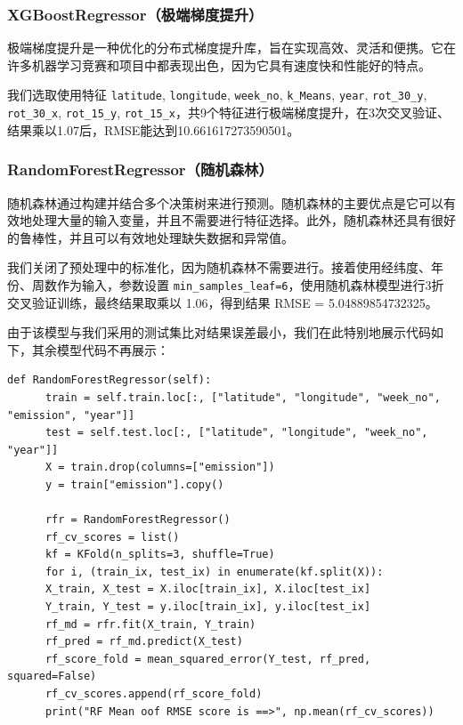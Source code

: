 \documentclass{ctexart}
\begin{document}
\begin{sloppypar}
\subsubsection{XGBoostRegressor（极端梯度提升）}

极端梯度提升是一种优化的分布式梯度提升库，旨在实现高效、灵活和便携。它在许多机器学习竞赛和项目中都表现出色，因为它具有速度快和性能好的特点。

我们选取使用特征 \texttt{latitude}, \texttt{longitude}, \texttt{week\_no}, \texttt{k\_Means}, \texttt{year}, \texttt{rot\_30\_y}, \texttt{rot\_30\_x}, \texttt{rot\_15\_y}, \texttt{rot\_15\_x}，共9个特征进行极端梯度提升，在3次交叉验证、结果乘以1.07后，RMSE能达到10.661617273590501。

\subsubsection{RandomForestRegressor（随机森林）}

随机森林通过构建并结合多个决策树来进行预测。随机森林的主要优点是它可以有效地处理大量的输入变量，并且不需要进行特征选择。此外，随机森林还具有很好的鲁棒性，并且可以有效地处理缺失数据和异常值。

我们关闭了预处理中的标准化，因为随机森林不需要进行。接着使用经纬度、年份、周数作为输入，参数设置 \texttt{min\_samples\_leaf=6}，使用随机森林模型进行3折交叉验证训练，最终结果取乘以 1.06，得到结果 RMSE = 5.04889854732325。

由于该模型与我们采用的测试集比对结果误差最小，我们在此特别地展示代码如下，其余模型代码不再展示：

\begin{lstlisting}[style=Python]
def RandomForestRegressor(self):
      train = self.train.loc[:, ["latitude", "longitude", "week_no", "emission", "year"]]
      test = self.test.loc[:, ["latitude", "longitude", "week_no", "year"]]
      X = train.drop(columns=["emission"])
      y = train["emission"].copy()

      rfr = RandomForestRegressor()
      rf_cv_scores = list()
      kf = KFold(n_splits=3, shuffle=True)
      for i, (train_ix, test_ix) in enumerate(kf.split(X)):
      X_train, X_test = X.iloc[train_ix], X.iloc[test_ix]
      Y_train, Y_test = y.iloc[train_ix], y.iloc[test_ix]
      rf_md = rfr.fit(X_train, Y_train)
      rf_pred = rf_md.predict(X_test)
      rf_score_fold = mean_squared_error(Y_test, rf_pred, squared=False)
      rf_cv_scores.append(rf_score_fold)
      print("RF Mean oof RMSE score is ==>", np.mean(rf_cv_scores))


\end{lstlisting}
\end{sloppypar}
\end{document}
